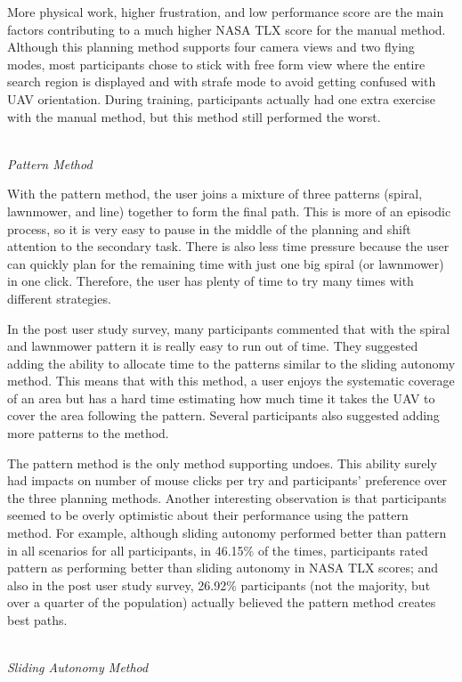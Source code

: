 \documentclass[lettersize, apacite, twoside, HRI]{apa_HRI}
\begin{document}
More physical work, higher frustration, and low performance score are the main factors contributing to a much higher NASA TLX score for the manual method. Although this planning method supports four camera views and two flying modes, most participants chose to stick with free form view where the entire search region is displayed and with strafe mode to avoid getting confused with UAV orientation. During training, participants actually had one extra exercise with the manual method, but this method still performed the worst.

~\\ \noindent \textit{Pattern Method}

With the pattern method, the user joins a mixture of three patterns (spiral, lawnmower, and line) together to form the final path. This is more of an episodic process, so it is very easy to pause in the middle of the planning and shift attention to the secondary task. There is also less time pressure because the user can quickly plan for the remaining time with just one big spiral (or lawnmower) in one click. Therefore, the user has plenty of time to try many times with different strategies.

In the post user study survey, many participants commented that with the spiral and lawnmower pattern it is really easy to run out of time. They suggested adding the ability to allocate time to the patterns similar to the sliding autonomy method. This means that with this method, a user enjoys the systematic coverage of an area but has a hard time estimating how much time it takes the UAV to cover the area following the pattern. Several participants also suggested adding more patterns to the method. 

The pattern method is the only method supporting undoes. This ability surely had impacts on number of mouse clicks per try and participants' preference over the three planning methods. Another interesting observation is that participants seemed to be overly optimistic about their performance using the pattern method. For example, although sliding autonomy performed better than pattern in all scenarios for all participants, in 46.15\% of the times, participants rated pattern as performing better than sliding autonomy in NASA TLX scores; and also in the post user study survey, 26.92\% participants (not the majority, but over a quarter of the population) actually believed the pattern method creates best paths.

~\\ \noindent \textit{Sliding Autonomy Method}
\end{document}
